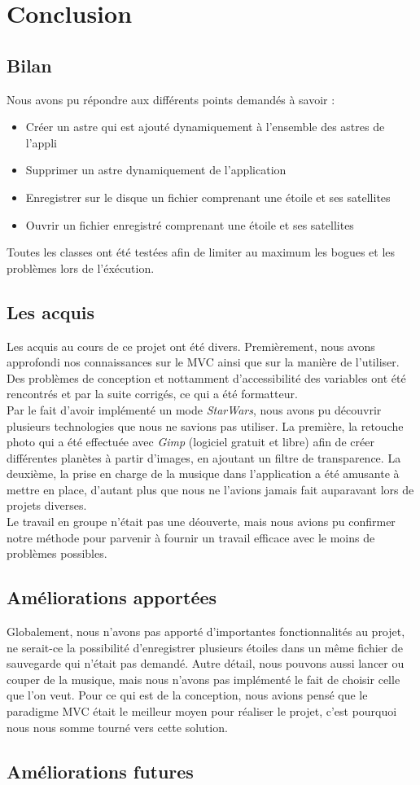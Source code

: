 \documentclass[a4paper,10pt]{article}
\begin{document}
\newpage
\newpage
\section{Conclusion}
\subsection{Bilan}
Nous avons pu répondre aux différents points demandés à savoir :
\begin{itemize}
 \item Créer un astre qui est ajouté dynamiquement à l'ensemble des astres de l'appli
 \item Supprimer un astre dynamiquement de l'application
 \item Enregistrer sur le disque un fichier comprenant une étoile et ses satellites
 \item Ouvrir un fichier enregistré comprenant une étoile et ses satellites
\end{itemize}

Toutes les classes ont été testées afin de limiter au maximum les bogues et les problèmes lors de l'éxécution.


\subsection{Les acquis}
Les acquis au cours de ce projet ont été divers. Premièrement, nous avons approfondi nos connaissances sur le MVC ainsi que sur la manière de l'utiliser. Des problèmes de conception et nottamment d'accessibilité des variables ont été rencontrés et par la suite corrigés, ce qui a été formatteur.
\\

Par le fait d'avoir implémenté un mode \textit{StarWars}, nous avons pu découvrir plusieurs technologies que nous ne savions pas utiliser. La première, la retouche photo qui a été effectuée avec \textit{Gimp} (logiciel gratuit et libre) afin de créer différentes planètes à partir d'images, en ajoutant un filtre de transparence. La deuxième, la prise en charge de la musique dans l'application a été amusante à mettre en place, d'autant plus que nous ne l'avions jamais fait auparavant lors de projets diverses.
\\

Le travail en groupe n'était pas une déouverte, mais nous avions pu confirmer notre méthode pour parvenir à fournir un travail efficace avec le moins de problèmes possibles.

\subsection{Améliorations apportées}
Globalement, nous n'avons pas apporté d'importantes fonctionnalités au projet, ne serait-ce la possibilité d'enregistrer plusieurs étoiles dans un même fichier de sauvegarde qui n'était pas demandé. Autre détail, nous pouvons aussi lancer ou couper de la musique, mais nous n'avons pas implémenté le fait de choisir celle que l'on veut. Pour ce qui est de la conception, nous avions pensé que le paradigme MVC était le meilleur moyen pour réaliser le projet, c'est pourquoi nous nous somme tourné vers cette solution. 

\subsection{Améliorations futures}
\end{document}

